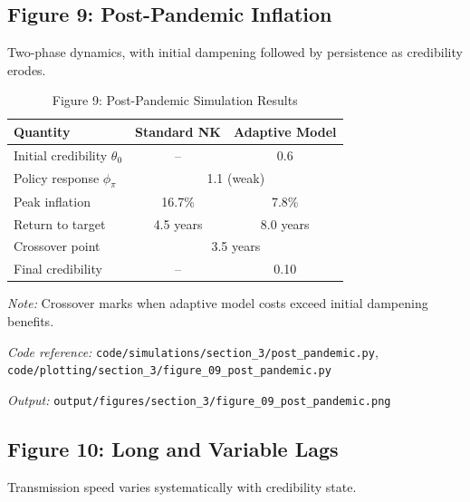 \documentclass[11pt]{article}
\begin{document}
\subsection{Figure 9: Post-Pandemic Inflation}

Two-phase dynamics, with initial dampening followed by persistence as credibility erodes.

\begin{table}[htbp]
\centering
\caption{Figure 9: Post-Pandemic Simulation Results}
\label{tab:post_pandemic}
\begin{threeparttable}
\begin{tabular}{lcc}
\toprule
Quantity & Standard NK & Adaptive Model \\
\midrule
Initial credibility $\theta_0$ & -- & 0.6 \\
Policy response $\phi_\pi$ & \multicolumn{2}{c}{1.1 (weak)} \\
\midrule
Peak inflation & 16.7\% & 7.8\% \\
Return to target & 4.5 years & 8.0 years \\
Crossover point & \multicolumn{2}{c}{3.5 years} \\
Final credibility & -- & 0.10 \\
\bottomrule
\end{tabular}
\begin{tablenotes}
\small
\item \textit{Note:} Crossover marks when adaptive model costs exceed initial dampening benefits.
\item \textit{Code reference:} \texttt{code/simulations/section\_3/post\_pandemic.py}, \texttt{code/plotting/section\_3/figure\_09\_post\_pandemic.py}
\item \textit{Output:} \texttt{output/figures/section\_3/figure\_09\_post\_pandemic.png}
\end{tablenotes}
\end{threeparttable}
\end{table}

\subsection{Figure 10: Long and Variable Lags}

Transmission speed varies systematically with credibility state.
\end{document}
